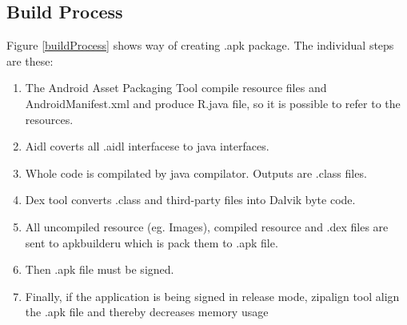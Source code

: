 \subsection{Build Process}
Figure \ref{buildProcess} shows way of creating .apk package. The individual steps are these:
\begin{enumerate}
\item The Android Asset Packaging Tool compile resource files and AndroidManifest.xml and produce R.java file, so it is possible to refer to the resources.
\item Aidl coverts all .aidl interfacese to java interfaces.
\item Whole code is compilated by java compilator. Outputs are .class files. 
\item Dex tool converts .class and third-party files into Dalvik byte code.
\item All uncompiled resource (eg. Images), compiled resource and .dex files are sent to apkbuilderu which is pack them to .apk file.
\item Then .apk file must be signed.
\item Finally, if the application is being signed in release mode, zipalign tool align the .apk file and thereby decreases memory usage
\end{enumerate}

